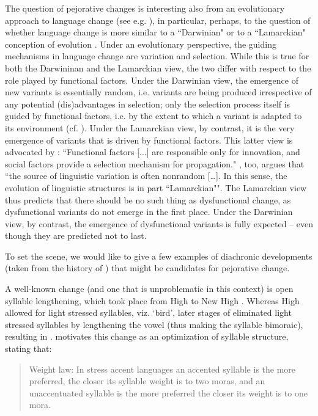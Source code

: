 \documentclass[output=paper,colorlinks,citecolor=brown]{langscibook}
\begin{document}
The question of pejorative changes is interesting also from an evolutionary approach to language change (see e.g. \citealt{Eckardt_2008}), in particular, perhaps, to the question of whether language change is more similar to a ``Darwinian" or to a ``Lamarckian" conception of evolution \citep{deVogelaer_2007}. Under an evolutionary perspective, the guiding mechanisms in language change are variation and selection. While this is true for both the Darwininan and the Lamarckian view, the two differ with respect to the role played by functional factors. Under the Darwinian view, the emergence of new variants is essentially random, i.e. variants are being produced irrespective of any potential (dis)advantages in selection; only the selection process itself is guided by functional factors, i.e. by the extent to which a variant is adapted to its environment  (cf. \citealt[318]{McMahon_1994}). Under the Lamarckian view, by contrast, it is the very emergence of variants that is driven by functional factors. This latter view is advocated by \citet[38]{Croft_2000}: ``Functional factors [...] are responsible only for innovation, and social factors provide a selection mechanism for propagation." \citet[192-193]{Haspelmath_1999}, too, argues that ``the source of linguistic variation is often nonrandom […]. In this sense, the evolution of linguistic structures is in part ``Lamarckian"". The Lamarckian view thus predicts that there should be no such thing as dysfunctional change, as dysfunctional variants do not emerge in the first place. Under the Darwinian view, by contrast, the emergence of dysfunctional variants is fully expected -- even though they are predicted not to last.

To set the scene, we would like to give a few examples of diachronic developments (taken from the history of ) that might be candidates for pejorative change. 

A well-known change (and one that is unproblematic in this context) is open syllable lengthening, which took place from  High  to  New High  \citep{Lahiri_Dresher_1999}. Whereas  High  allowed for light stressed syllables, viz. \textipa{["fo.g@l]} `bird', later stages of  eliminated light stressed syllables by lengthening the vowel (thus making the syllable bimoraic), resulting in \textipa{["fo:.g@l]}. \citet{Vennemann_1988} motivates this change as an optimization of syllable structure, stating that:

\begin{quote}
Weight law: In stress accent languages an accented syllable is the more preferred, the closer its syllable weight is to two moras, and an unaccentuated syllable is the more preferred the closer its weight is to one mora. \citep[30]{Vennemann_1988}
\end{quote}
\end{document}
